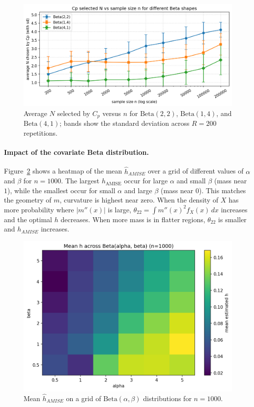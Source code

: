 \documentclass[11pt]{article}
\begin{document}
\begin{figure}[h]
\centering
\includegraphics[width=.95\linewidth]{output/avgN_vs_n.png}
\caption{Average \(N\) selected by \(C_p\) versus \(n\) for \(\mathrm{Beta}(2,2)\), \(\mathrm{Beta}(1,4)\), and \(\mathrm{Beta}(4,1)\); bands show the standard deviation across \(R=200\) repetitions.}
\label{fig:q2}
\end{figure}
\FloatBarrier

\paragraph{Impact of the covariate Beta distribution.}
Figure~\ref{fig:q3} shows a heatmap of the mean \(\hat h_{AMISE}\) over a grid of different values of \(\alpha\) and \(\beta\) for \(n=1000\).
The largest \(h_{\mathrm{AMISE}}\) occur for large \(\alpha\) and small \(\beta\) (mass near \(1\)), while the smallest occur for small \(\alpha\) and large \(\beta\) (mass near \(0\)).
This matches the geometry of \(m\), curvature is highest near zero.
When the density of \(X\) has more probability where \(|m''(x)|\) is large, \(\theta_{22}=\int m''(x)^2 f_X(x)\,dx\) increases and the optimal \(h\) decreases. 
When more mass is in flatter regions, \(\theta_{22}\) is smaller and \(h_{AMISE}\) increases.

\begin{figure}[h]
\centering
\includegraphics[width=.9\linewidth]{output/heatmap_h_by_alpha_beta.png}
\caption{Mean \(\hat h_{AMISE}\) on a grid of \(\mathrm{Beta}(\alpha,\beta)\) distributions for \(n=1000\).}
\label{fig:q3}
\end{figure}
\FloatBarrier
\end{document}
